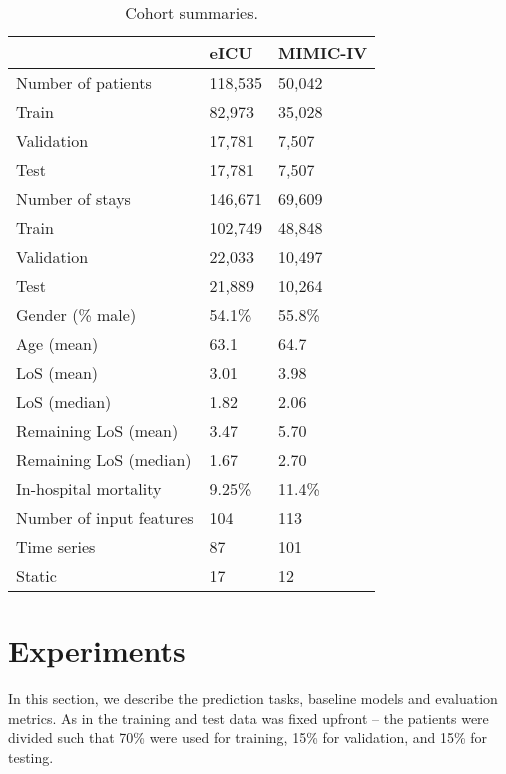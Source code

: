 \documentclass[sigconf]{acmart}
\begin{document}
\begin{table}[h]
    \caption{Cohort summaries.}
    \label{tab:cohortsummary}
    \centering
    \begin{tabular}{lll}
        \toprule
        & \textbf{eICU} & \textbf{MIMIC-IV} \\
        \midrule
        Number of patients & 118,535 & 50,042 \\
        \hspace{2em}Train & 82,973 & 35,028 \\
        \hspace{2em}Validation & 17,781 & 7,507 \\
        \hspace{2em}Test & 17,781 & 7,507 \\
        Number of stays & 146,671 & 69,609 \\
        \hspace{2em}Train & 102,749 & 48,848 \\
        \hspace{2em}Validation & 22,033 & 10,497 \\
        \hspace{2em}Test & 21,889 & 10,264 \\\hline
        Gender (\% male) & 54.1\% & 55.8\% \\
        Age (mean) & 63.1 & 64.7 \\
        LoS (mean) & 3.01 & 3.98 \\
        LoS (median) & 1.82 & 2.06 \\
        Remaining LoS (mean) & 3.47 & 5.70 \\
        Remaining LoS (median) & 1.67 & 2.70 \\
        In-hospital mortality & 9.25\% & 11.4\% \\\hline
        Number of input features & 104 & 113 \\
        \hspace{2em}Time series & 87 & 101 \\
        \hspace{2em}Static & 17 & 12 \\
\bottomrule
    \end{tabular}
\end{table}

\section{Experiments}

In this section, we describe the prediction tasks, baseline models and evaluation metrics. As in \citet{harutyunyan} the training and test data was fixed upfront -- the patients were divided such that 70\% were used for training, 15\% for validation, and 15\% for testing. 
\end{document}
